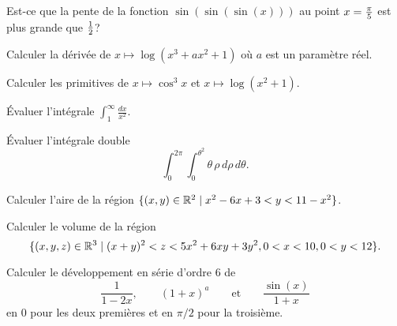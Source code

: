 

\begin{exercice}
    Est-ce que la pente de la fonction $\sin(\sin(\sin(x)))$ au point
    $x={\pi\over5}$ est plus grande que $1\over2$?
\end{exercice}

\begin{exercice}
    Calculer la dérivée de $x\mapsto\log(x^3+ax^2+1)$ où $a$ est un paramètre
    réel.
\end{exercice}

\begin{exercice}
    Calculer les primitives de $x\mapsto\cos^3 x$ et 
    $x\mapsto\log(x^2+1)$.
\end{exercice}

\begin{exercice}
    Évaluer l'intégrale $\int_1^{\infty} \frac{dx}{x^2}$.
\end{exercice}

\begin{exercice}
    Évaluer l'intégrale double 
    $$\int_0^{2\pi}\int_0^{\theta^2}\theta\,\rho\,d\rho\,d\theta.$$
\end{exercice}

\begin{exercice}
    Calculer l'aire de la région 
    $\{(x,y)\in\mathbb{R}^2\mid x^2-6x+3 < y < 11-x^2\}$.
\end{exercice}

\begin{exercice}
    Calculer le volume de la région 
    $$\{(x,y,z)\in\mathbb{R}^3\mid (x+y)^2 < z < 5x^2+6xy+3y^2, 0<x<10, 0<y<12\}.$$
\end{exercice}

\begin{exercice}
    Calculer le développement en série d'ordre 6 de
\[
    \frac{1}{1-2x},\qquad
    (1+x)^a\qquad\text{et}\qquad
    \frac{\sin(x)}{1+x}
\]
en $0$ pour les deux premières et en $\pi/2$ pour la troisième.
\end{exercice}

